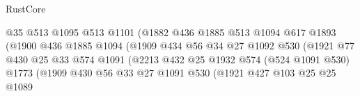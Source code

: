\begin{lexlean}{RustCore}
\begin{coremodule}
                                        @35
                                        @513
                                        @1095
                                        @513
                                        @1101
                                        (@1882
                                          @436
                                          @1885
                                          @513
                                          @1094
                                          @617
                                          @1893
                                          (@1900
                                            @436
                                            @1885
                                            @1094
                                            (@1909
                                              @434
                                              @56
                                              @34
                                              @27
                                              @1092
                                              @530
                                              (@1921
                                                @77
                                                @430
                                                @25
                                                @33
                                                @574
                                                @1091
                                                (@2213
                                                  @432
                                                  @25
                                                  @1932
                                                  @574
                                                  (@524 @1091 @530)
                                                  @1773
                                                  (@1909
                                                    @430
                                                    @56
                                                    @33
                                                    @27
                                                    @1091
                                                    @530
                                                    (@1921
                                                      @427
                                                      @103
                                                      @25
                                                      @25
                                                      @1089

\end{coremodule}
\end{lexlean}
